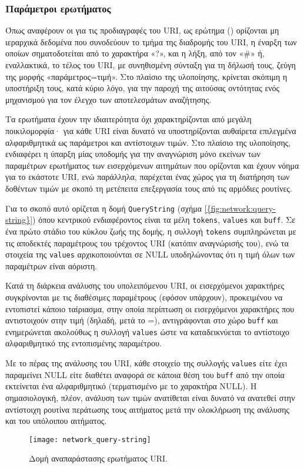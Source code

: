 \subsubsection{Παράμετροι ερωτήματος}
\label{ssubsec:network:query-string}

Όπως αναφέρουν οι \textcite[23--24]{rfc3986} για τις προδιαγραφές του URI, ως
ερώτημα () ορίζονται μη ιεραρχικά δεδομένα που συνοδεύουν το τμήμα της
διαδρομής του URI, η έναρξη των οποίων σηματοδοτείται από το χαρακτήρα «?», και
η λήξη, από τον «\#» ή, εναλλακτικά, το τέλος του URI, με συνηθισμένη σύνταξη
για τη δήλωσή τους, ζεύγη της μορφής «παράμετρος=τιμή». Στο πλαίσιο της
υλοποίησης, κρίνεται σκόπιμη η υποστήριξη τους, κατά κύριο λόγο, για την παροχή
της αιτούσας οντότητας ενός μηχανισμού για τον έλεγχο των αποτελεσμάτων
αναζήτησης.

Τα ερωτήματα έχουν την ιδιαιτερότητα όχι χαρακτηρίζονται από μεγάλη
ποικιλομορφία· για κάθε URI είναι δυνατό να υποστηρίζονται αυθαίρετα επιλεγμένα
αλφαριθμητικά ως παράμετροι και αντίστοιχων τιμών. Στο πλαίσιο της υλοποίησης,
ενδιαφέρει η ύπαρξη μίας υποδομής για την αναγνώριση μόνο εκείνων των παραμέτρων
ερωτήματος των εισερχόμενων αιτημάτων που ορίζονται και έχουν νόημα για το
εκάστοτε URI, ενώ παράλληλα, παρέχεται ένας χώρος για τη διατήρηση των δοθέντων
τιμών με σκοπό τη μετέπειτα επεξεργασία τους από τις αρμόδιες ρουτίνες.

Για το σκοπό αυτό ορίζεται η δομή \verb~QueryString~ (σχήμα
\ref{{fig:network:query-string}}) όπου κεντρικού ενδιαφέροντος είναι τα μέλη
\verb~tokens~, \verb~values~ και \verb~buff~. Σε ένα πρώτο στάδιο του κύκλου
ζωής της δομής, η συλλογή \verb~tokens~ συμπληρώνεται με τις αποδεκτές
παραμέτρους του τρέχοντος URI (κατόπιν αναγνώρισής του), ενώ τα στοιχεία της
\verb~values~ αρχικοποιούνται σε NULL υποδηλώνοντας ότι η τιμή όλων των
παραμέτρων είναι αόριστη.

Κατά τη διάρκεια ανάλυσης του υπολειπόμενου URI, οι εισερχόμενοι χαρακτήρες
συγκρίνονται με τις διαθέσιμες παραμέτρους (εφόσον υπάρχουν), προκειμένου να
εντοπιστεί κάποιο ταίριασμα, στην οποία περίπτωση οι εισερχόμενοι χαρακτήρες που
αντιστοιχούν στην τιμή (δηλαδή, μετά το =), αντιγράφονται στο χώρο \verb~buff~
και ενημερώνεται ακολούθως η συλλογή \verb~values~ ώστε να καταδεικνύεται το
αντίστοιχο αλφαριθμητικό της εντοπισμένης παραμέτρου.

Με το πέρας της ανάλυσης του URI, κάθε στοιχείο της συλλογής \verb~values~
είτε έχει παραμείνει NULL είτε διαθέτει αναφορά σε κάποια θέση του \verb~buff~
από την οποία εκτείνεται ένα αλφαριθμητικό (τερματισμένο με το χαρακτήρα NULL).
Η σημασιολογική, πλέον, ανάλυση των τιμών ανατίθεται είναι δυνατό να ανατεθεί
στην αντίστοιχη ρουτίνα περάτωσης τους αιτήματος μετά την ολοκλήρωση της
ανάλυσης και του υπόλοιπου αιτήματος.

\begin{figure}
    \caption{Δομή αναπαράστασης ερωτήματος URI.
    \label{fig:network:query-string}}
    \begin{center}
    \texttt{[image: network\_query-string]}
    \end{center}
\end{figure}
















